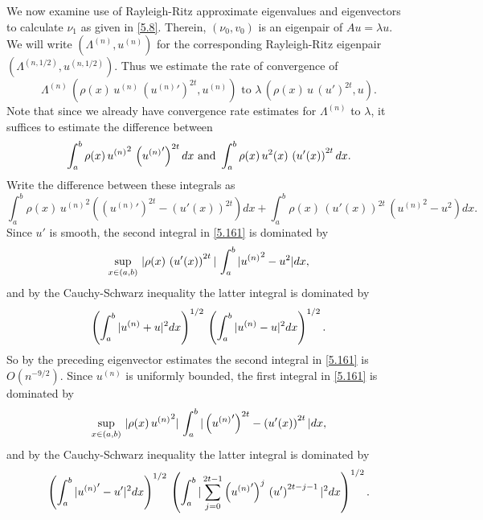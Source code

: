 \documentclass[final]{siamltex}
\numberwithin{equation}{section}
\begin{document}
We now examine use of Rayleigh-Ritz approximate eigenvalues and eigenvectors to calculate $\nu_1$ as given in \eqref{5.8}. Therein, $(\nu_0, v_0)$ is an eigenpair of $A u = \lambda u$. We will write $(\Lambda^{(n)}, u^{(n)})$ for the corresponding Rayleigh-Ritz eigenpair $(\Lambda^{(n,1/2)}, u^{(n,1/2)})$. Thus we estimate the rate of convergence of
\begin{equation} \label{5.15}
\Lambda^{(n)} \, \left( \rho(x) \, u^{(n)} \, \left({u^{(n)}}'\right)^{2t}, u^{(n)} \right) \text{ to }  \lambda \,
\left( \rho(x) \, u \, (u')^{2t} , u\right).
\end{equation}
Note that since we already have convergence rate estimates for $\Lambda^{(n)}$ to $\lambda$, it suffices to estimate the difference between
\begin{equation}
\int_a^b \rho(x) \, {u^{(n)}}^2  \, \left({u^{(n)}}'\right)^{2t} dx \text{ and }
\int_a^b \rho(x) \, u^2(x) \, \left(u'(x)\right)^{2t} dx. \notag
\end{equation}
Write the difference between these integrals as
\begin{equation} \label{5.161}
\int_a^b \rho(x) \, {u^{(n)}}^2 \left( \left({u^{(n)}}'\right)^{2t}- \left(u'(x)\right)^{2t} \right) dx+
\int_a^b \rho(x) \, \left(u'(x)\right)^{2t} \, \left({u^{(n)}}^2 - u^2\right) dx.
\end{equation}
Since $u'$ is smooth, the second integral in \eqref{5.161} is dominated by
\begin{equation}
\sup_{x \in (a,b)} \, |\rho(x) \, \left(u'(x)\right)^{2t}| \, \int_a^b |{u^{(n)}}^2 - u^2|dx, \notag
\end{equation}
and by the Cauchy-Schwarz inequality the latter integral is dominated by
\begin{equation}
\left( \int_a^b |u^{(n)}+ u|^2 dx\right)^{1/2}  \,  \left( \int_a^b |u^{(n)}- u|^2 dx\right)^{1/2}. \notag
\end{equation}
So by the preceding eigenvector estimates the second integral in \eqref{5.161} is $O(n^{-9/2})$. Since $u^{(n)}$ is uniformly bounded, the first integral in \eqref{5.161} is dominated by
\begin{equation}
\sup_{x \in (a,b)} \, |\rho(x) \, {u^{(n)}}^2| \, \int_a^b |\left({u^{(n)}}'\right)^{2t}- \left(u'(x)\right)^{2t}|dx, \notag
\end{equation}
and by the Cauchy-Schwarz inequality the latter integral is dominated by
\begin{equation}
\left( \int_a^b |{u^{(n)}}'- u'|^2 dx\right)^{1/2}  \,  \left( \int_a^b |\sum_{j=0}^{2t -1}  \left({u^{(n)}}'\right)^j \,
\left(u'\right)^{2t-j-1}|^2 dx\right)^{1/2}. \notag
\end{equation}
\end{document}
